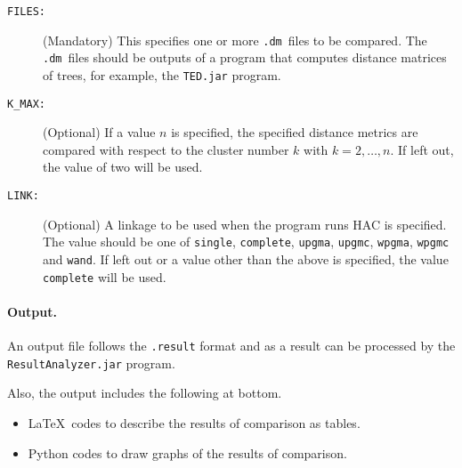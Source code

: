 \documentclass{article}
\newcommand\dm{\texttt{.dm}}
\begin{document}
\begin{description}
\item[\tt FILES:] (Mandatory)
  This specifies one or more \dm\ files to be compared.
  The \dm\ files should be outputs of
  a program that computes distance matrices of trees, 
  for example, the \texttt{TED.jar} program.
\item[\tt K\_MAX:] (Optional)
  If a value $n$ is specified,
  the specified distance metrics are compared
  with respect to the cluster number $k$ with $k = 2, \dots, n$.
  If left out, the value of two will be used.
\item[\tt LINK:] (Optional)
  A linkage to be used when the program runs HAC
  is specified.
  The value should be one of
  \texttt{single}, \texttt{complete}, \texttt{upgma}, \texttt{upgmc}, 
  \texttt{wpgma}, \texttt{wpgmc} and \texttt{wand}.
  If left out or a value other than the above is specified,
  the value \texttt{complete} will be used.
\end{description}

\paragraph{Output.}
An output file follows the \texttt{.result} format and as a result
can be processed by the \texttt{ResultAnalyzer.jar} program.

Also, the output includes the following at bottom.
\begin{itemize}
\item
  \LaTeX\ codes to describe the results of comparison as tables.
\item
  Python codes to draw graphs of the results of comparison.
\end{itemize}
\end{document}

